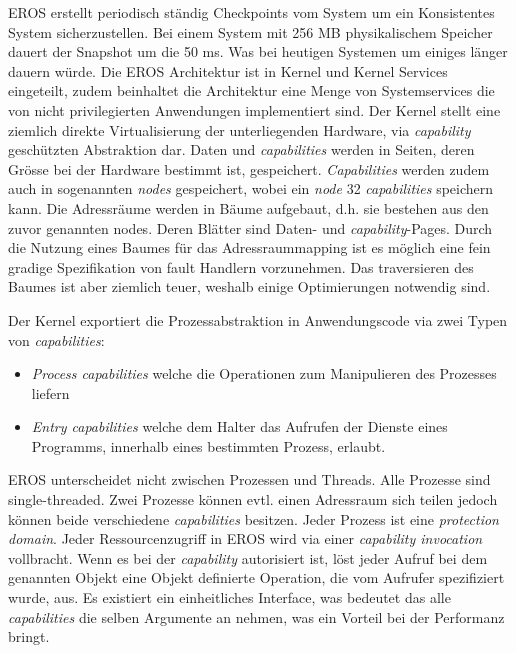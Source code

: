 \documentclass[11pt,technote]{IEEEtran}
\begin{document}
      EROS erstellt periodisch st\"andig Checkpoints vom System um ein Konsistentes System sicherzustellen. Bei einem System mit 256 MB physikalischem Speicher
      dauert der Snapshot um die 50 ms. Was bei heutigen Systemen um einiges l\"anger dauern w\"urde.
      Die EROS Architektur ist in Kernel und Kernel Services eingeteilt, zudem beinhaltet die Architektur eine Menge von Systemservices
      die von nicht privilegierten Anwendungen implementiert sind.
      Der Kernel stellt eine ziemlich direkte Virtualisierung der unterliegenden Hardware, via \textit{capability} gesch\"utzten Abstraktion dar.
      Daten und \textit{capabilities} werden in Seiten, deren Gr\"osse bei der Hardware bestimmt ist, gespeichert. 
      \textit{Capabilities} werden zudem auch in sogenannten \textit{nodes} gespeichert, wobei ein \textit{node} 32 \textit{capabilities} speichern kann.
      Die Adressr\"aume werden in B\"aume aufgebaut, d.h. sie bestehen aus den zuvor genannten nodes. Deren Bl\"atter sind Daten- und \textit{capability}-Pages.
      Durch die Nutzung eines Baumes f\"ur das Adressraummapping ist es m\"oglich eine fein gradige Spezifikation von fault Handlern vorzunehmen.
      Das traversieren des Baumes ist aber ziemlich teuer, weshalb einige Optimierungen notwendig sind. 
        
      Der Kernel exportiert die Prozessabstraktion in Anwendungscode via zwei Typen von \textit{capabilities}:
      \begin{itemize}
        \item \textit{Process capabilities} welche die Operationen zum Manipulieren des Prozesses liefern 
        \item \textit{Entry capabilities} welche dem Halter das Aufrufen der Dienste eines Programms, innerhalb eines bestimmten Prozess, erlaubt.
      \end{itemize}
        
      EROS unterscheidet nicht zwischen Prozessen und Threads. Alle Prozesse sind single-threaded. Zwei Prozesse k\"onnen evtl. einen Adressraum sich teilen
      jedoch k\"onnen beide verschiedene \textit{capabilities} besitzen. Jeder Prozess ist eine \textit{protection domain}.
      Jeder Ressourcenzugriff in EROS wird via einer \textit{capability invocation} vollbracht. Wenn es bei der \textit{capability} autorisiert ist,
      l\"ost jeder Aufruf bei dem genannten Objekt eine Objekt definierte Operation, die vom Aufrufer spezifiziert wurde, aus. 
      Es existiert ein einheitliches Interface, was bedeutet das alle \textit{capabilities} die selben Argumente an nehmen,
      was ein Vorteil bei der Performanz bringt.
        
\end{document}
